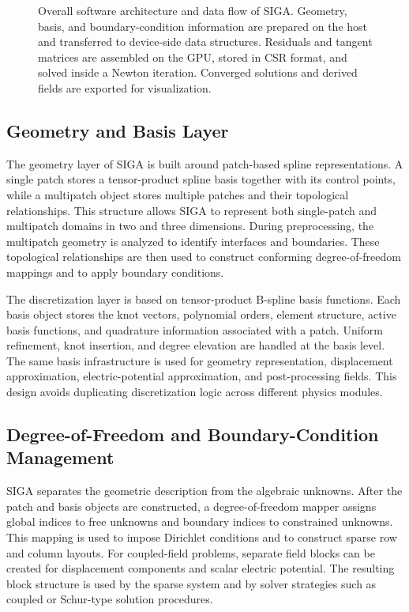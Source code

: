 \documentclass[11pt]{article}
\begin{document}
\begin{figure}[H]
{%
}
\caption{Overall software architecture and data flow of SIGA. Geometry, basis, and boundary-condition information are prepared on the host and transferred to device-side data structures. Residuals and tangent matrices are assembled on the GPU, stored in CSR format, and solved inside a Newton iteration. Converged solutions and derived fields are exported for visualization.}
\label{fig:siga_architecture_overview}
\end{figure}

\subsection{Geometry and Basis Layer}

The geometry layer of SIGA is built around patch-based spline representations. A single patch stores a tensor-product spline basis together with its control points, while a multipatch object stores multiple patches and their topological relationships. This structure allows SIGA to represent both single-patch and multipatch domains in two and three dimensions. During preprocessing, the multipatch geometry is analyzed to identify interfaces and boundaries. These topological relationships are then used to construct conforming degree-of-freedom mappings and to apply boundary conditions.

The discretization layer is based on tensor-product B-spline basis functions. Each basis object stores the knot vectors, polynomial orders, element structure, active basis functions, and quadrature information associated with a patch. Uniform refinement, knot insertion, and degree elevation are handled at the basis level. The same basis infrastructure is used for geometry representation, displacement approximation, electric-potential approximation, and post-processing fields. This design avoids duplicating discretization logic across different physics modules.

\subsection{Degree-of-Freedom and Boundary-Condition Management}

SIGA separates the geometric description from the algebraic unknowns. After the patch and basis objects are constructed, a degree-of-freedom mapper assigns global indices to free unknowns and boundary indices to constrained unknowns. This mapping is used to impose Dirichlet conditions and to construct sparse row and column layouts. For coupled-field problems, separate field blocks can be created for displacement components and scalar electric potential. The resulting block structure is used by the sparse system and by solver strategies such as coupled or Schur-type solution procedures.
\end{document}

